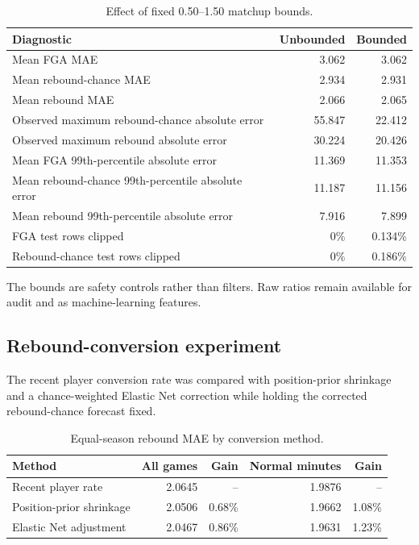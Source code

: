 \documentclass[11pt]{article}
\begin{document}
\begin{table}[H]
\centering
\caption{Effect of fixed 0.50--1.50 matchup bounds.}
\label{tab:bounds}
\small
\begin{tabularx}{\textwidth}{Xrr}
\toprule
Diagnostic & Unbounded & Bounded \\
\midrule
Mean FGA MAE & 3.062 & 3.062 \\
Mean rebound-chance MAE & 2.934 & 2.931 \\
Mean rebound MAE & 2.066 & 2.065 \\
Observed maximum rebound-chance absolute error & 55.847 & 22.412 \\
Observed maximum rebound absolute error & 30.224 & 20.426 \\
Mean FGA 99th-percentile absolute error & 11.369 & 11.353 \\
Mean rebound-chance 99th-percentile absolute error & 11.187 & 11.156 \\
Mean rebound 99th-percentile absolute error & 7.916 & 7.899 \\
FGA test rows clipped & 0\% & 0.134\% \\
Rebound-chance test rows clipped & 0\% & 0.186\% \\
\bottomrule
\end{tabularx}
\end{table}

The bounds are safety controls rather than filters. Raw ratios remain available
for audit and as machine-learning features.

\subsection{Rebound-conversion experiment}
\label{sec:conversion-results}

The recent player conversion rate was compared with position-prior shrinkage
and a chance-weighted Elastic Net correction while holding the corrected
rebound-chance forecast fixed.

\begin{table}[H]
\centering
\caption{Equal-season rebound MAE by conversion method.}
\label{tab:conversion}
\small
\begin{tabular}{lrrrr}
\toprule
Method & All games & Gain & Normal minutes & Gain \\
\midrule
Recent player rate & 2.0645 & -- & 1.9876 & -- \\
Position-prior shrinkage & 2.0506 & 0.68\% & 1.9662 & 1.08\% \\
Elastic Net adjustment & 2.0467 & 0.86\% & 1.9631 & 1.23\% \\
\bottomrule
\end{tabular}
\end{table}
\end{document}
